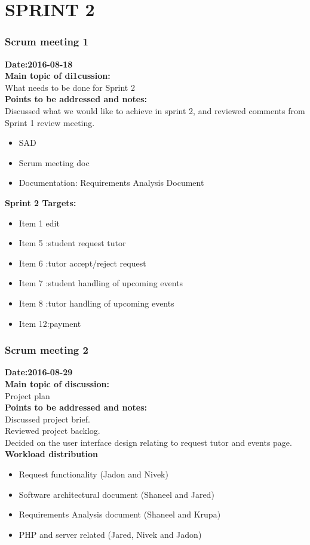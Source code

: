 \documentclass[12pt]{article}
\begin{document}
{%
\section{SPRINT 2}
\subsubsection{Scrum meeting 1}
\textbf{Date:2016-08-18}\\
\textbf{Main topic of di1cussion:}\\
What needs to be done for Sprint 2\\
\textbf{Points to be addressed and notes:}\\
Discussed what we would like to achieve in sprint 2, and reviewed comments from Sprint 1 review meeting. 
\begin{itemize}
\item SAD 
\item Scrum meeting doc
\item Documentation: Requirements Analysis Document
\end{itemize}
\textbf{Sprint 2 Targets:}\\
\begin{itemize}
\item Item 1 edit 
\item Item 5 :student request tutor
\item Item 6 :tutor accept/reject request
\item Item 7 :student handling of upcoming events
\item Item 8 :tutor handling of upcoming events
\item Item 12:payment 
\end{itemize}
\subsubsection{Scrum meeting 2}
\textbf{Date:2016-08-29}\\
\textbf{Main topic of discussion:}\\
Project plan\\
\textbf{Points to be addressed and notes:}\\
Discussed project brief. \\
Reviewed project backlog.\\
Decided on the user interface design relating to request tutor and events page.\\ 
\textbf{Workload distribution}
\begin{itemize}
\item Request functionality  (Jadon and Nivek)
\item Software architectural document (Shaneel and Jared)
\item Requirements Analysis document (Shaneel and Krupa)
\item PHP and server related (Jared, Nivek and Jadon)
\end{itemize}
}
\end{document}

